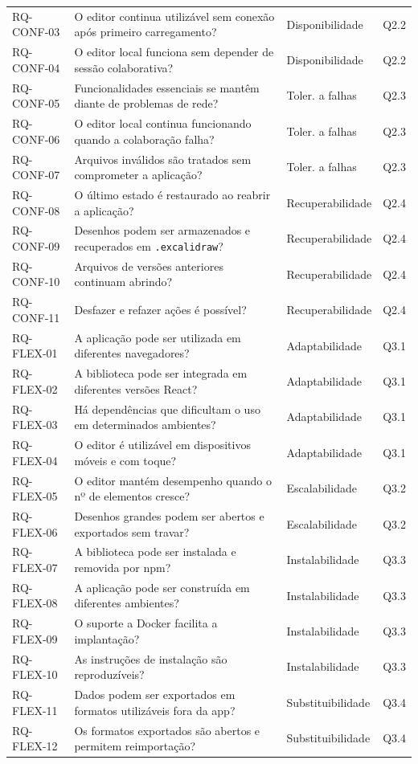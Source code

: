 \documentclass[12pt]{article}
\begin{document}
\begin{table}[!ht]
\begin{tabular}{p{1.9cm}p{10.0cm}p{2.4cm}p{1.2cm}}
RQ-CONF-03 & O editor continua utilizável sem conexão após primeiro carregamento? & Disponibilidade & Q2.2 \\
RQ-CONF-04 & O editor local funciona sem depender de sessão colaborativa? & Disponibilidade & Q2.2 \\
RQ-CONF-05 & Funcionalidades essenciais se mantêm diante de problemas de rede? & Toler. a falhas & Q2.3 \\
RQ-CONF-06 & O editor local continua funcionando quando a colaboração falha? & Toler. a falhas & Q2.3 \\
RQ-CONF-07 & Arquivos inválidos são tratados sem comprometer a aplicação? & Toler. a falhas & Q2.3 \\
RQ-CONF-08 & O último estado é restaurado ao reabrir a aplicação? & Recuperabilidade & Q2.4 \\
RQ-CONF-09 & Desenhos podem ser armazenados e recuperados em \texttt{.excalidraw}? & Recuperabilidade & Q2.4 \\
RQ-CONF-10 & Arquivos de versões anteriores continuam abrindo? & Recuperabilidade & Q2.4 \\
RQ-CONF-11 & Desfazer e refazer ações é possível? & Recuperabilidade & Q2.4 \\
\midrule
RQ-FLEX-01 & A aplicação pode ser utilizada em diferentes navegadores? & Adaptabilidade & Q3.1 \\
RQ-FLEX-02 & A biblioteca pode ser integrada em diferentes versões React? & Adaptabilidade & Q3.1 \\
RQ-FLEX-03 & Há dependências que dificultam o uso em determinados ambientes? & Adaptabilidade & Q3.1 \\
RQ-FLEX-04 & O editor é utilizável em dispositivos móveis e com toque? & Adaptabilidade & Q3.1 \\
RQ-FLEX-05 & O editor mantém desempenho quando o nº de elementos cresce? & Escalabilidade & Q3.2 \\
RQ-FLEX-06 & Desenhos grandes podem ser abertos e exportados sem travar? & Escalabilidade & Q3.2 \\
RQ-FLEX-07 & A biblioteca pode ser instalada e removida por npm? & Instalabilidade & Q3.3 \\
RQ-FLEX-08 & A aplicação pode ser construída em diferentes ambientes? & Instalabilidade & Q3.3 \\
RQ-FLEX-09 & O suporte a Docker facilita a implantação? & Instalabilidade & Q3.3 \\
RQ-FLEX-10 & As instruções de instalação são reproduzíveis? & Instalabilidade & Q3.3 \\
RQ-FLEX-11 & Dados podem ser exportados em formatos utilizáveis fora da app? & Substituibilidade & Q3.4 \\
RQ-FLEX-12 & Os formatos exportados são abertos e permitem reimportação? & Substituibilidade & Q3.4 \\
\bottomrule
\end{tabular}
\end{table}
\end{document}
